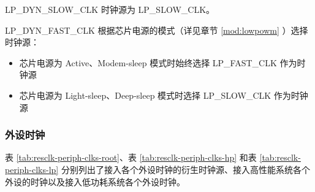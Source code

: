 \documentclass[main\_\_CN.tex]{subfiles}
\begin{document}
LP\_DYN\_SLOW\_CLK 时钟源为 LP\_SLOW\_CLK。

LP\_DYN\_FAST\_CLK 根据芯片电源的模式（详见章节 \ref{mod:lowpowm} \textit{}）选择时钟源：

\begin{itemize}
    \item 芯片电源为 Active、Modem-sleep 模式时始终选择 LP\_FAST\_CLK 作为时钟源
    \item 芯片电源为 Light-sleep、Deep-sleep 模式时选择 LP\_SLOW\_CLK 作为时钟源
\end{itemize}

\subsubsection{外设时钟}
表 \ref{tab:resclk-periph-clks-root}、表 \ref{tab:resclk-periph-clks-hp} 和表 \ref{tab:resclk-periph-clks-lp} 分别列出了接入各个外设时钟的衍生时钟源、接入高性能系统各个外设的时钟以及接入低功耗系统各个外设时钟。
\end{document}
